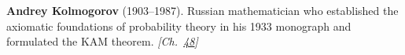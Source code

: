 \textbf{Andrey Kolmogorov} (1903–1987). Russian mathematician who established the axiomatic foundations of probability theory in his 1933 monograph and formulated the KAM theorem. \emph{[Ch.~\hyperref[ch:threebody]{48}]}


